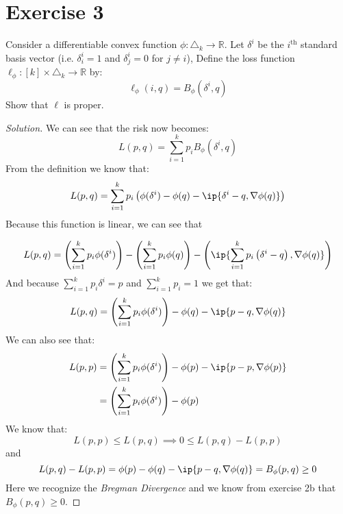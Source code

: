 \documentclass[10pt, a4paper, twoside]{amsart}
\DeclarePairedDelimiter{\ip}\langle\rangle
\newenvironment{solution}
               {\let\oldqedsymbol=\qedsymbol
                \renewcommand{\qedsymbol}{$\blacktriangleleft$}
                \begin{proof}[Solution]}
               {\end{proof}
                \renewcommand{\qedsymbol}{\oldqedsymbol}}
\begin{document}
\section*{Exercise 3}
Consider a differentiable convex function $\phi: \triangle_k\rightarrow \mathbb{R}$. Let $\delta^i$ be the $i^{\text{th}}$ standard basis vector (i.e. $\delta^i_i = 1$ and $\delta^i_j = 0$ for $j\neq i$), Define the loss function $\ell_{\phi}:[k]\times \triangle_k \rightarrow \mathbb{R}$ by:
\begin{equation*}
  \ell_{\phi}(i,q) = B_{\phi}\left(\delta^{i},q\right)
\end{equation*}
Show that $\ell$ is proper.
\begin{solution}
We can see that the risk now becomes:
\begin{equation*}
  L(p,q) = \sum^{k}_{i=1}p_iB_{\phi} \left(\delta^{i},q\right)
\end{equation*}
From the definition we know that:
\begin{equation*}
  L(p,q) = \sum^{k}_{i=1}p_i\left(\phi(\delta^i)-\phi(q)-\ip{\delta^i-q,\nabla \phi(q)} \right)
\end{equation*}
Because this function is linear, we can see that

\begin{equation*}
  L(p,q) = \left(\sum^{k}_{i=1}p_i\phi(\delta^i)\right)-\left(\sum^{k}_{i=1}p_i\phi(q)\right)-\left(\ip{\sum^{k}_{i=1}p_i\left(\delta^i-q\right),\nabla \phi(q)}\right)
\end{equation*}
And because $\sum^{k}_{i=1}p_i\delta^i = p$ and $\sum^{k}_{i=1}p_i = 1$ we get that:
\begin{equation*}
  L(p,q)= \left(\sum^{k}_{i=1}p_i\phi(\delta^i)\right) - \phi(q) - \ip{p-q,\nabla \phi(q)}
\end{equation*}
We can also see that:
\begin{align*}
  L(p,p) &=  \left(\sum^{k}_{i=1}p_i\phi(\delta^i)\right) - \phi(p) - \ip{p-p,\nabla \phi(p)}\\
  &=  \left(\sum^{k}_{i=1}p_i\phi(\delta^i)\right) - \phi(p)
\end{align*}
We know that:
\begin{equation*}
  L(p,p)\leq L(p,q) \implies 0\leq L(p,q) - L(p,p)
\end{equation*}
and
\begin{equation*}
  L(p,q) - L(p,p) = \phi(p)-\phi(q)-\ip{p-q,\nabla \phi(q)} = B_{\phi}(p,q) \geq 0
\end{equation*}
Here we recognize the \textit{Bregman Divergence} and we know from exercise 2b that $B_{\phi}(p,q) \geq 0$.


\end{solution}
\end{document}
